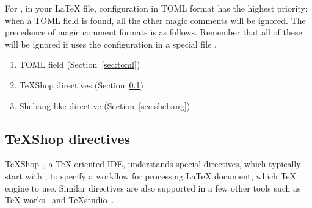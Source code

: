 \documentclass[draft]{llmk-doc}
\begin{document}
For , in your {\LaTeX} file, configuration in TOML format has the
highest priority: when a TOML field is found, all the other magic comments will
be ignored. The precedence of magic comment formats is as follows. Remember
that all of these will be ignored if  uses the configuration in a
special file .
%
\begin{enumerate}
\item TOML field (Section~\ref{sec:toml})
\item {\TeX}Shop directives (Section~\ref{sec:ts-directive})
\item Shebang-like directive (Section~\ref{sec:shebang})
\end{enumerate}

\subsection{{\TeX}Shop directives}
\label{sec:ts-directive}

{\TeX}Shop~\cite{texshop}, a {\TeX}-oriented IDE, understands special
directives, which typically start with , to
specify a workflow for processing {\LaTeX} document, \eg which {\TeX} engine to
use. Similar directives are also supported in a few other tools such as {\TeX}%
works~\cite{texworks} and {\TeX}studio~\cite{texstudio}.
\end{document}
